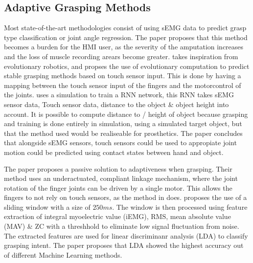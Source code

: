 \documentclass[../main.tex]{subfiles}
\begin{document}
\subsection{Adaptive Grasping Methods}
Most state-of-the-art methodologies consist of using sEMG data to predict grasp type classification or joint angle regression.
The paper \cite{Yuki2023} proposes that this method becomes a burden for the HMI user, as the severity of the amputation increases and the loss of muscle recording arears become greater.
\cite{Yuki2023} takes inspiration from evolutionary robotics, and propses the use of evolutionary computation to predict stable grasping methods based on touch sensor input.
This is done by having a mapping between the touch sensor input of the fingers and the motorcontrol of the joints.
\cite{Yuki2023} uses a simulation to train a RNN network, this RNN takes sEMG sensor data, Touch sensor data, distance to the object \& object height into account.
It is possible to compute distance to / height of object because grasping and training is done entirely in simulation, using a simulated target object, but that the method used would be realiseable for prosthetics. 
The paper concludes that alongside sEMG sensors, touch sensors could be used to appropiate joint motion could be predicted using contact states between hand and object.

The paper \cite{YanchaoWang2022} proposes a passive solution to adaptiveness when grasping.
Their method uses an underactuated, compliant linkage mechanism, where the joint rotation of the finger joints can be driven by a single motor.
This allows the fingers to not rely on touch sensors, as the method in \cite{Yuki2023} does.
\cite{YanchaoWang2022} proposes the use of a sliding window with a size of $250ms$.
The window is then processed using feature extraction of integral myoelectric value (iEMG), RMS, mean absolute value (MAV) \& ZC with a threshhold to eliminate low signal fluctuation from noise.
The extracted features are used for linear discriminanr analysis (LDA) to classify grasping intent. 
The paper proposes that LDA showed the highest accuracy out of different Machine Learning methods.
\end{document}
